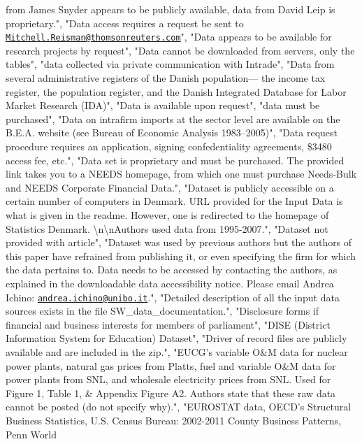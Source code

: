 \documentclass[]{article}
\begin{document}
\begin{itemize}
  from James Snyder appears to be publicly available, data from David
  Leip is proprietary.", "Data access requires a request be sent to
  \href{mailto:Mitchell.Reisman@thomsonreuters.com}{\nolinkurl{Mitchell.Reisman@thomsonreuters.com}}",
  "Data appears to be available for research projects by request", "Data
  cannot be downloaded from servers, only the tables", "data collected
  via private communication with Intrade", "Data from several
  administrative registers of the Danish population--- the income tax
  register, the population register, and the Danish Integrated Database
  for Labor Market Research (IDA)", "Data is available upon request",
  "data must be purchased", "Data on intrafirm imports at the sector
  level are available on the B.E.A. website (see Bureau of Economic
  Analysis 1983--2005)", "Data request procedure requires an
  application, signing confedentiality agreements, \$3480 access fee,
  etc.", "Data set is proprietary and must be purchased. The provided
  link takes you to a NEEDS homepage, from which one must purchase
  Needs-Bulk and NEEDS Corporate Financial Data.", "Dataset is publicly
  accessible on a certain number of computers in Denmark. URL provided
  for the Input Data is what is given in the readme. However, one is
  redirected to the homepage of Statistics Denmark.
  \textbackslash{}n\textbackslash{}nAuthors used data from 1995-2007.",
  "Dataset not provided with article", "Dataset was used by previous
  authors but the authors of this paper have refrained from publishing
  it, or even specifying the firm for which the data pertains to. Data
  needs to be accessed by contacting the authors, as explained in the
  downloadable data accessibility notice. Please email Andrea Ichino:
  \href{mailto:andrea.ichino@unibo.it}{\nolinkurl{andrea.ichino@unibo.it}}.",
  "Detailed description of all the input data sources exists in the file
  SW\_data\_documentation.", "Disclosure forms if financial and business
  interests for members of parliament", "DISE (District Information
  System for Education) Dataset", "Driver of record files are publicly
  available and are included in the zip.", "EUCG's variable O\&M data
  for nuclear power plants, natural gas prices from Platts, fuel and
  variable O\&M data for power plants from SNL, and wholesale
  electricity prices from SNL. Used for Figure 1, Table 1, \& Appendix
  Figure A2. Authors state that these raw data cannot be posted (do not
  specify why).", "EUROSTAT data, OECD's Structural Business Statistics,
  U.S. Census Bureau: 2002-2011 County Business Patterns, Penn World

\end{itemize}
\end{document}
